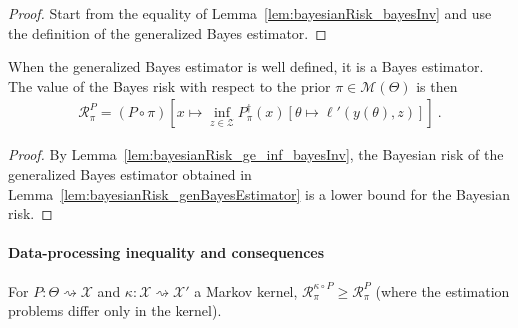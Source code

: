 \begin{proof}\leanok
{}
Start from the equality of Lemma~\ref{lem:bayesianRisk_bayesInv} and use the definition of the generalized Bayes estimator.
\end{proof}

\begin{theorem}
  \label{thm:isBayesEstimator_genBayesEstimator}
  \leanok
  When the generalized Bayes estimator is well defined, it is a Bayes estimator. The value of the Bayes risk with respect to the prior $\pi \in \mathcal M(\Theta)$ is then
  \begin{align*}
  \mathcal R^P_\pi = (P \circ \pi)\left[x \mapsto \inf_{z \in \mathcal Z} P_\pi^\dagger(x) \left[\theta \mapsto \ell'(y(\theta), z)\right]\right]
  \: .
  \end{align*}
\end{theorem}

\begin{proof}\leanok
{}
By Lemma~\ref{lem:bayesianRisk_ge_inf_bayesInv}, the Bayesian risk of the generalized Bayes estimator obtained in Lemma~\ref{lem:bayesianRisk_genBayesEstimator} is a lower bound for the Bayesian risk.
\end{proof}

\paragraph{Data-processing inequality and consequences}

\begin{theorem}
  \label{thm:data_proc_bayesRisk}
  \leanok
  For $P : \Theta \rightsquigarrow \mathcal X$ and $\kappa : \mathcal X \rightsquigarrow \mathcal X'$ a Markov kernel, $\mathcal R^{\kappa \circ P}_\pi \ge \mathcal R^{P}_\pi$ (where the estimation problems differ only in the kernel).
\end{theorem}


